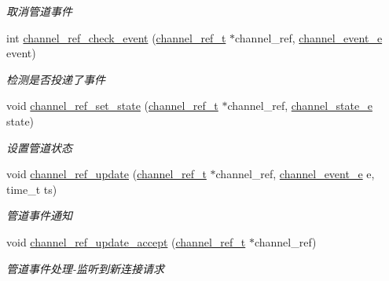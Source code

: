 \begin{DoxyCompactItemize}
\begin{DoxyCompactList}\small\item\em 取消管道事件 \end{DoxyCompactList}\item 
int \hyperlink{a00049_a7134a0dab5db76d26dac56924267e5ac_a7134a0dab5db76d26dac56924267e5ac}{channel\+\_\+ref\+\_\+check\+\_\+event} (\hyperlink{a00051_a151271c9d188ef28d4d24bb81dcc1263_a151271c9d188ef28d4d24bb81dcc1263}{channel\+\_\+ref\+\_\+t} $\ast$channel\+\_\+ref, \hyperlink{a00051_a5ad43ab162fdf9ad53cde10ed3d87d99_a5ad43ab162fdf9ad53cde10ed3d87d99}{channel\+\_\+event\+\_\+e} event)
\begin{DoxyCompactList}\small\item\em 检测是否投递了事件 \end{DoxyCompactList}\item 
void \hyperlink{a00049_a7e19561cc06440ebdf63ced5526c9e21_a7e19561cc06440ebdf63ced5526c9e21}{channel\+\_\+ref\+\_\+set\+\_\+state} (\hyperlink{a00051_a151271c9d188ef28d4d24bb81dcc1263_a151271c9d188ef28d4d24bb81dcc1263}{channel\+\_\+ref\+\_\+t} $\ast$channel\+\_\+ref, \hyperlink{a00051_a1956eea3012f780b5d592a9d09d9873c_a1956eea3012f780b5d592a9d09d9873c}{channel\+\_\+state\+\_\+e} state)
\begin{DoxyCompactList}\small\item\em 设置管道状态 \end{DoxyCompactList}\item 
void \hyperlink{a00049_aac9295d2423894326c8b62e0ee851f89_aac9295d2423894326c8b62e0ee851f89}{channel\+\_\+ref\+\_\+update} (\hyperlink{a00051_a151271c9d188ef28d4d24bb81dcc1263_a151271c9d188ef28d4d24bb81dcc1263}{channel\+\_\+ref\+\_\+t} $\ast$channel\+\_\+ref, \hyperlink{a00051_a5ad43ab162fdf9ad53cde10ed3d87d99_a5ad43ab162fdf9ad53cde10ed3d87d99}{channel\+\_\+event\+\_\+e} e, time\+\_\+t ts)
\begin{DoxyCompactList}\small\item\em 管道事件通知 \end{DoxyCompactList}\item 
void \hyperlink{a00049_a31545bffe4e0837eaf754465732642c4_a31545bffe4e0837eaf754465732642c4}{channel\+\_\+ref\+\_\+update\+\_\+accept} (\hyperlink{a00051_a151271c9d188ef28d4d24bb81dcc1263_a151271c9d188ef28d4d24bb81dcc1263}{channel\+\_\+ref\+\_\+t} $\ast$channel\+\_\+ref)
\begin{DoxyCompactList}\small\item\em 管道事件处理-\/监听到新连接请求 \end{DoxyCompactList}\item 

\end{DoxyCompactItemize}
